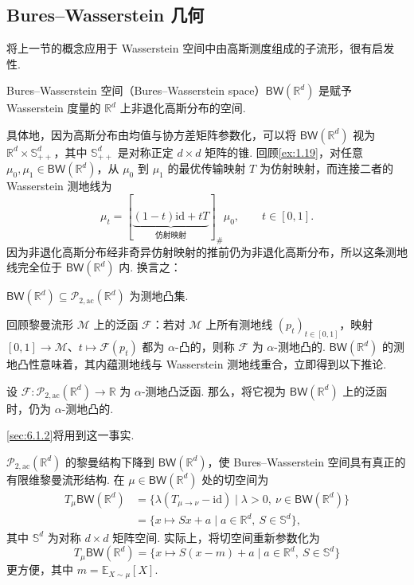 \subsection{Bures--Wasserstein 几何}\label{sec:5.5}

将上一节的概念应用于 Wasserstein 空间中由高斯测度组成的子流形，很有启发性.

\begin{definition}\label{def:5.18}
Bures--Wasserstein 空间（Bures--Wasserstein space）$\mathsf{BW}(\mathbb R^d)$ 是赋予 Wasserstein 度量的 $\mathbb R^d$ 上非退化高斯分布的空间.
\end{definition}

具体地，因为高斯分布由均值与协方差矩阵参数化，可以将 $\mathsf{BW}(\mathbb R^d)$ 视为 $\mathbb R^d\times\mathbb S_{++}^d$，其中 $\mathbb S_{++}^d$ 是对称正定 $d\times d$ 矩阵的锥. 回顾\autoref{ex:1.19}，对任意 $\mu_0,\mu_1\in\mathsf{BW}(\mathbb R^d)$，从 $\mu_0$ 到 $\mu_1$ 的最优传输映射 $T$ 为仿射映射，而连接二者的 Wasserstein 测地线为
$$
\mu_t=[\underbrace{(1-t)\mathrm{id}+tT}_{\text{仿射映射}}]_\#\mu_0,
\qquad t\in[0,1].
$$
因为非退化高斯分布经非奇异仿射映射的推前仍为非退化高斯分布，所以这条测地线完全位于 $\mathsf{BW}(\mathbb R^d)$ 内. 换言之：

\begin{proposition}\label{prop:5.19}
$\mathsf{BW}(\mathbb R^d)\subseteq\mathcal P_{2,\mathrm{ac}}(\mathbb R^d)$ 为测地凸集.
\end{proposition}

回顾黎曼流形 $\mathcal M$ 上的泛函 $\mathcal F$：若对 $\mathcal M$ 上所有测地线 $(p_t)_{t\in[0,1]}$，映射 $[0,1]\to\mathcal M$、$t\mapsto\mathcal F(p_t)$ 都为 $\alpha$-凸的，则称 $\mathcal F$ 为 $\alpha$-测地凸的. $\mathsf{BW}(\mathbb R^d)$ 的测地凸性意味着，其内蕴测地线与 Wasserstein 测地线重合，立即得到以下推论.

\begin{corollary}\label{cor:5.20}
设 $\mathcal F:\mathcal P_{2,\mathrm{ac}}(\mathbb R^d)\to\mathbb R$ 为 $\alpha$-测地凸泛函. 那么，将它视为 $\mathsf{BW}(\mathbb R^d)$ 上的泛函时，仍为 $\alpha$-测地凸的.
\end{corollary}

\autoref{sec:6.1.2}将用到这一事实.

$\mathcal P_{2,\mathrm{ac}}(\mathbb R^d)$ 的黎曼结构下降到 $\mathsf{BW}(\mathbb R^d)$，使 Bures--Wasserstein 空间具有真正的有限维黎曼流形结构. 在 $\mu\in\mathsf{BW}(\mathbb R^d)$ 处的切空间为
$$
\begin{aligned}
T_\mu\mathsf{BW}(\mathbb R^d)
&=\{\lambda(T_{\mu\to\nu}-\mathrm{id})\mid\lambda>0,\ \nu\in\mathsf{BW}(\mathbb R^d)\}\\
&=\{x\mapsto Sx+a\mid a\in\mathbb R^d,\ S\in\mathbb S^d\},
\end{aligned}
$$
其中 $\mathbb S^d$ 为对称 $d\times d$ 矩阵空间. 实际上，将切空间重新参数化为
$$
T_\mu\mathsf{BW}(\mathbb R^d)
=\{x\mapsto S(x-m)+a\mid a\in\mathbb R^d,\ S\in\mathbb S^d\}
$$
更方便，其中 $m=\mathbb E_{X\sim\mu}[X]$.

